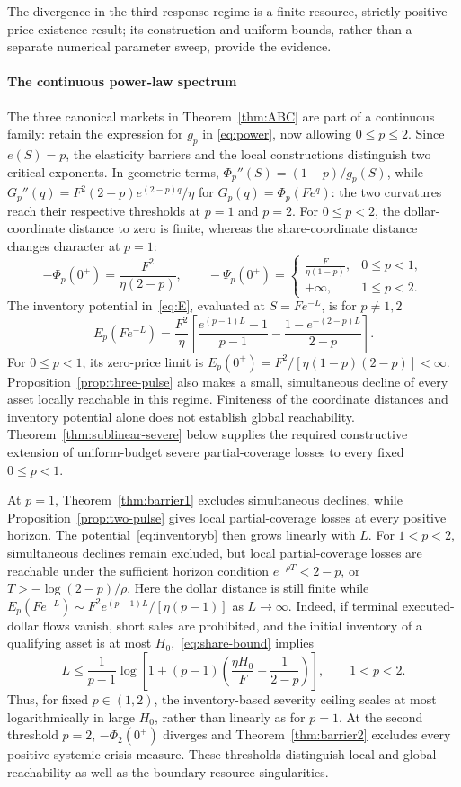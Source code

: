 \documentclass[review,hidelinks,onefignum,onetabnum]{siamonline250211}
\begin{document}
The divergence in the third response regime is a finite-resource, strictly positive-price existence result; its construction and uniform bounds, rather than a separate numerical parameter sweep, provide the evidence.

\paragraph{The continuous power-law spectrum}
The three canonical markets in Theorem~\ref{thm:ABC} are part of a
continuous family: retain the expression for $g_p$ in
\eqref{eq:power}, now allowing $0\le p\le2$. Since $e(S)=p$,
the elasticity barriers and the local constructions distinguish
two critical exponents. In geometric terms,
$\Phi_p''(S)=(1-p)/g_p(S)$, while
$G_p''(q)=F^2(2-p)e^{(2-p)q}/\eta$ for
$G_p(q)=\Phi_p(Fe^q)$: the two curvatures reach their
respective thresholds at $p=1$ and $p=2$.
For $0\le p<2$, the dollar-coordinate
distance to zero is finite, whereas the share-coordinate distance
changes character at $p=1$:
\[
-\Phi_p(0^+)=\frac{F^2}{\eta(2-p)},\qquad
-\Psi_p(0^+)=
\begin{cases}
\displaystyle\frac{F}{\eta(1-p)},&0\le p<1,\\[3pt]
+\infty,&1\le p<2.
\end{cases}
\]
The inventory potential in~\eqref{eq:E}, evaluated at
$S=Fe^{-L}$, is for $p\ne1,2$
\[
E_p(Fe^{-L})=\frac{F^2}{\eta}
\left[\frac{e^{(p-1)L}-1}{p-1}
-\frac{1-e^{-(2-p)L}}{2-p}\right].
\]
For $0\le p<1$, its zero-price limit is
$E_p(0^+)=F^2/[\eta(1-p)(2-p)]<\infty$.
Proposition~\ref{prop:three-pulse} also makes a small, simultaneous
decline of every asset locally reachable in this regime.
Finiteness of the coordinate distances and inventory potential
alone does not establish global reachability. Theorem~\ref{thm:sublinear-severe}
below supplies the required constructive extension of uniform-budget
severe partial-coverage losses to every fixed $0\le p<1$.

At $p=1$, Theorem~\ref{thm:barrier1} excludes simultaneous declines,
while Proposition~\ref{prop:two-pulse} gives local partial-coverage
losses at every positive horizon. The potential~\eqref{eq:inventoryb}
then grows linearly with $L$. For $1<p<2$, simultaneous declines
remain excluded, but local partial-coverage losses are reachable
under the sufficient horizon condition
$e^{-\rho T}<2-p$, or $T>-\log(2-p)/\rho$.
Here the dollar distance is still finite while
$E_p(Fe^{-L})\sim F^2e^{(p-1)L}/[\eta(p-1)]$ as $L\to\infty$.
Indeed, if terminal executed-dollar flows vanish, short sales
are prohibited, and the initial inventory of a qualifying asset
is at most $H_0$,~\eqref{eq:share-bound} implies
\[
L\le\frac{1}{p-1}\log\!\left[
1+(p-1)\left(\frac{\eta H_0}{F}+\frac{1}{2-p}\right)
\right],\qquad 1<p<2.
\]
Thus, for fixed $p\in(1,2)$, the inventory-based severity
ceiling scales at most logarithmically in large $H_0$, rather than
linearly as for $p=1$. At the second threshold $p=2$,
$-\Phi_2(0^+)$ diverges and Theorem~\ref{thm:barrier2}
excludes every positive systemic crisis measure. These thresholds distinguish local and global reachability as well
as the boundary resource singularities.
\end{document}
